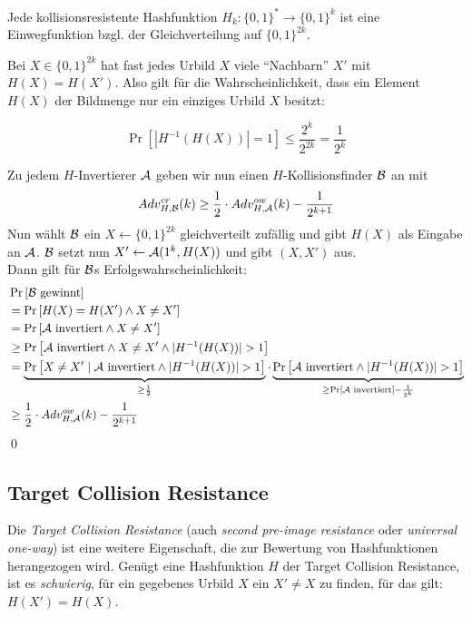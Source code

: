 \begin{theorem}
Jede kollisionsresistente Hashfunktion $H_k \colon \{0,1\}^* \rightarrow \{0,1\}^k$ ist eine Einwegfunktion bzgl. der Gleichverteilung auf $\{0,1\}^{2k}$.
\end{theorem}

\begin{beweisidee}
Bei $X \in \{0,1\}^{2k}$ hat fast jedes Urbild $X$ viele "`Nachbarn"' $X'$ mit $H(X) = H(X')$. Also gilt für die Wahrscheinlichkeit, dass ein Element $H(X)$
der Bildmenge nur ein einziges Urbild $X$ besitzt:

\begin{equation*}
\Pr \left[ | H^{-1}(H(X))| = 1\right] \leq \frac{2^k}{2^{2k}} = \frac{1}{2^k}
\end{equation*}
\end{beweisidee}

\begin{beweis}
Zu jedem $H$-Invertierer $\mathcal{A}$ geben wir nun einen $H$-Kollisionsfinder $\mathcal{B}$ an mit
\begin{equation*}
Adv^{cr}_{H,\mathcal{B}}(k) \geq \frac{1}{2} \cdot Adv^{ow}_{H,\mathcal{A}}(k) - \frac{1}{2^{k+1}}
\end{equation*} 
Nun wählt $\mathcal{B}$ ein $X \leftarrow \{0,1\}^{2k}$ gleichverteilt zufällig und gibt $H(X)$ als Eingabe an $\mathcal{A}$. $\mathcal{B}$ setzt nun $X' \leftarrow \mathcal{A}(1^k, H(X))$ und
gibt $(X, X')$ aus.\\
Dann gilt für $\mathcal{B}$s Erfolgswahrscheinlichkeit:
\begin{align*}
	&\Pr \left[\mathcal{B} \text{ gewinnt}\right]\\
	&= \Pr\left[H(X) = H(X') \land X \not = X'\right]\\
	&= \Pr \left[\mathcal{A} \text{ invertiert} \land X \not = X'\right]\\
	&\geq \Pr \left[\mathcal{A} \text{ invertiert} \land X \not = X' \land \vert H^{-1}(H(X)) \vert > 1\right]\\
	&= \underbrace{\Pr \left[X \not = X' \mid \mathcal{A} \text{ invertiert} \land \vert H^{-1}(H(X)) \vert > 1\right]}_{\geq \frac{1}{2}}
	\cdot \underbrace{\Pr \left[\mathcal{A} \text{ invertiert} \land \vert H^{-1}(H(X)) \vert > 1\right]}_{\geq \Pr \left[\mathcal{A} \text{ invertiert}\right] - \frac{1}{2^k}}\\
	&\geq \frac{1}{2} \cdot Adv^{ow}_{H,\mathcal{A}}(k) - \frac{1}{2^{k+1}}
\end{align*}
\qed
\end{beweis}


\subsection{Target Collision Resistance}
Die \textit{Target Collision Resistance} (auch \textit{second pre-image resistance} oder \textit{universal one-way}) ist eine weitere Eigenschaft, die zur
Bewertung von Hashfunktionen herangezogen wird. Genügt eine Hashfunktion $H$ der Target Collision Resistance, ist es \textit{schwierig}, für ein gegebenes
Urbild $X$ ein $X' \not = X$ zu finden, für das gilt: $H(X') = H(X)$.

